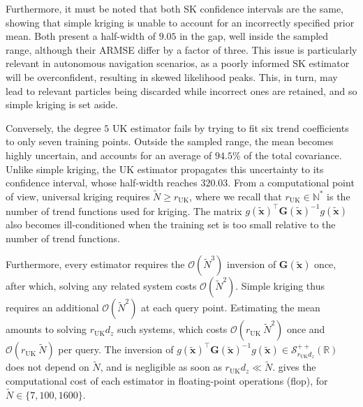 Furthermore, it must be noted that both SK confidence intervals are the same, showing that simple kriging is unable to account for an incorrectly specified prior mean. Both present a half-width of $9.05$ in the gap, well inside the sampled range, although their ARMSE differ by a factor of three. This issue is particularly relevant in autonomous navigation scenarios, as a poorly informed SK estimator will be overconfident, resulting in skewed likelihood peaks. This, in turn, may lead to relevant particles being discarded while incorrect ones are retained, and so simple kriging is set aside.

Conversely, the degree $5$ UK estimator fails by trying to fit six trend coefficients to only seven training points. Outside the sampled range, the mean becomes highly uncertain, and accounts for an average of $94.5\%$ of the total covariance. Unlike simple kriging, the UK estimator propagates this uncertainty to its confidence interval, whose half-width reaches $320.03$. From a computational point of view, universal kriging requires $\tilde{N}\geq r_{\mathrm{UK}}$, where we recall that $r_{\mathrm{UK}}\in\mathbb{N}^*$ is the number of trend functions used for kriging. The matrix $g(\tilde{\mathbf{x}})^\top \mathbf{G}(\tilde{\mathbf{x}})^{-1}g(\tilde{\mathbf{x}})$ also becomes ill-conditioned when the training set is too small relative to the number of trend functions.

Furthermore, every estimator requires the $\mathcal{O}(\tilde{N}^3)$ inversion of $\mathbf{G}(\tilde{\mathbf{x}})$ once, after which, solving any related system costs $\mathcal{O}(\tilde{N}^2)$. Simple kriging thus requires an additional $\mathcal{O}(\tilde{N}^2)$ at each query point. Estimating the mean amounts to solving $r_{\mathrm{UK}}d_z$ such systems, which costs $\mathcal{O}(r_{\mathrm{UK}}\:\tilde{N}^2)$ once and $\mathcal{O}(r_{\mathrm{UK}}\:\tilde{N})$ per query. The inversion of $g(\tilde{\mathbf{x}})^\top \mathbf{G}(\tilde{\mathbf{x}})^{-1}g(\tilde{\mathbf{x}})\in\mathcal{S}_{r_{\mathrm{UK}}d_z}^{++}(\mathbb{R})$ does not depend on $\tilde{N}$, and is negligible as soon as $r_{\mathrm{UK}}d_z\ll\tilde{N}$.  gives the computational cost of each estimator in floating-point operations (flop), for $\tilde{N}\in\{7,100,1600\}$.

\begin{table}[!htb]
	\centering
	\caption{Computational cost of the five estimators, split into the setup and the query costs. The simple kriging row is the cost of reconstructing the field, paid by every estimator, and the following ones are what estimating the mean adds to it. Since their cost is independent of the mean they were given, the two simple estimators share the same row.}\label{tab:kriging_cost}
\end{table}

